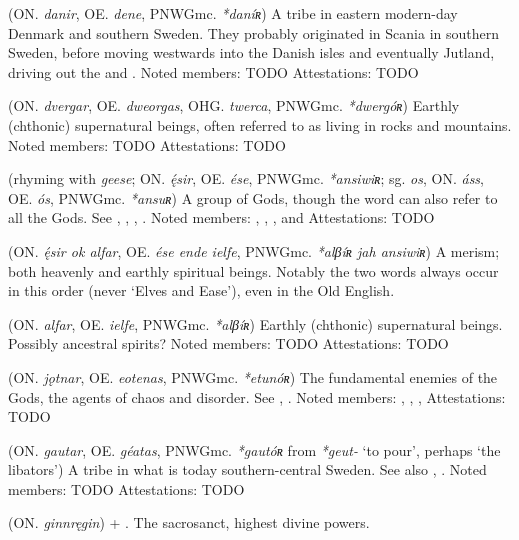 \begin{itemize}

 (ON. \emph{danir}, OE. \emph{dene}, PNWGmc. \emph{*daníʀ})
  A tribe in eastern modern-day Denmark and southern Sweden. They probably originated in Scania in southern Sweden, before moving westwards into the Danish isles and eventually Jutland, driving out the  and .
  Noted members: TODO
  Attestations: TODO

 (ON. \emph{dvergar}, OE. \emph{dweorgas}, OHG. \emph{twerca}, PNWGmc. \emph{*dwergóʀ})
  Earthly (chthonic) supernatural beings, often referred to as living in rocks and mountains.
  Noted members: TODO
  Attestations: TODO

 (rhyming with \emph{geese}; ON. \emph{ę́sir}, OE. \emph{ése}, PNWGmc. \emph{*ansiwiʀ}; sg. \emph{os}, ON. \emph{áss}, OE. \emph{ós}, PNWGmc. \emph{*ansuʀ})
  A group of Gods, though the word can also refer to all the Gods. See , , , .
  Noted members: , , ,  and 
  Attestations: TODO

 (ON. \emph{ę́sir ok alfar}, OE. \emph{ése ende ielfe}, PNWGmc. \emph{*alβíʀ jah ansiwiʀ})
  A merism; both heavenly and earthly spiritual beings. Notably the two words always occur in this order (never ‘Elves and Ease’), even in the Old English.

 (ON. \emph{alfar}, OE. \emph{ielfe}, PNWGmc. \emph{*alβíʀ})
  Earthly (chthonic) supernatural beings. Possibly ancestral spirits?
  Noted members: TODO
  Attestations: TODO

 (ON. \emph{jǫtnar}, OE. \emph{eotenas}, PNWGmc. \emph{*etunóʀ})
  The fundamental enemies of the Gods, the agents of chaos and disorder. See , .
  Noted members: , , , 
  Attestations: TODO

 (ON. \emph{gautar}, OE. \emph{géatas}, PNWGmc. \emph{*gautóʀ} from \emph{*geut-} ‘to pour’, perhaps ‘the libators’)
  A tribe in what is today southern-central Sweden. See also , .
  Noted members: TODO
  Attestations: TODO

 (ON. \emph{ginnręgin})
   + . The sacrosanct, highest divine powers.


\end{itemize}
